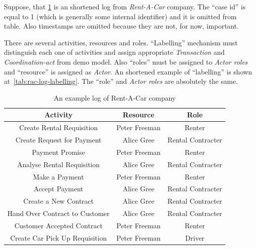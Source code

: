 Suppose, that \cref{tab:rac-log} is an shortened log from \textit{Rent-A-Car} company. The ``case id'' is equal to 1 (which is generally some internal identifier) and it is omitted from table. Also timestamps are omitted because they are not, for now, important.  

There are several activities, resources and roles. ``Labelling'' mechanism must distinguish each one of activities and assign appropriate \textit{Transaction} and \textit{Coordination-act} from \gls{demo} model. Also ``roles'' must be assigned to \textit{Actor roles} and ``resource'' is assigned as \textit{Actor}. An shortened example of ``labelling'' is shown at~\cref{tab:rac-log-labelling}. The ``role'' and \textit{Actor roles} are absolutely the same. 

\begin{table}[ht!]
\centering
\begin{tabular}{ | c | c | c | }
\hline
	\textbf{Activity} & \textbf{Resource} & \textbf{Role} \\ \hline
	Create Rental  Requisition & Peter Freeman & Renter \\ \hline
	Create Request for Payment & Alice Gree & Rental Contracter \\ \hline
	Payment Promise & Peter Freeman & Renter \\ \hline
	Analyse Rental Requisition & Alice Gree & Rental Contracter \\ \hline
	Make a Payment & Peter Freeman & Renter \\ \hline
	Accept Payment & Alice Gree & Rental Contracter \\ \hline
	Create a New Contract & Alice Gree & Rental Contracter \\ \hline
	Hand Over Contract to Customer & Alice Gree & Rental Contracter \\ \hline
	Customer Accepted Contract & Peter Freeman & Renter \\ \hline
	Create Car Pick Up  Requisition & Peter Freeman & Driver \\ \hline
\end{tabular}
\caption{An example log of Rent-A-Car company}
\label{tab:rac-log}
  

\end{table}
